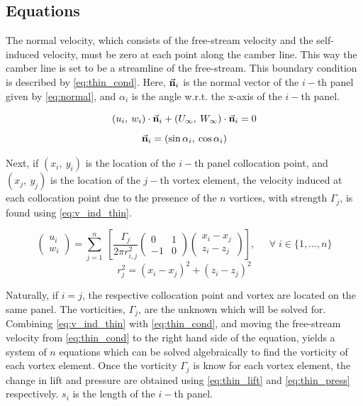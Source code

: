 \subsection{Equations}
The normal velocity, which consists of the free-stream velocity and the
self-induced velocity, must be zero at each point along the camber line. This
way the camber line is set to be a streamline of the free-stream. This
boundary condition is described by \autoref{eq:thin_cond}. Here,
$\vec{\bf{n}}_i$ is the normal vector of the $i-$th panel given by
\autoref{eq:normal}, and $\alpha_i$ is the angle w.r.t. the x-axis of the $i-$th
panel.

\begin{equation}
\label{eq:thin_cond}
    \left( u_i, \: w_i \right) \cdot \vec{\bf{n}}_i + \left( U_\infty,
    \: W_\infty \right) \cdot  \vec{\bf{n}}_i = 0
\end{equation}
\begin{equation}
\label{eq:normal}
    \vec{\bf{n}}_i = \left( \sin \alpha_i, \: \cos \alpha_i \right)
\end{equation}

Next, if $\left( x_i, \: y_i \right)$ is the location of the $i-$th panel
collocation point, and $\left( x_j, \: y_j \right)$ is the location of the
$j-$th vortex element, the velocity induced at each collocation point due to the
presence of the $n$ vortices, with strength $\Gamma_j$, is found using
\autoref{eq:v_ind_thin}.
\medskip

\begin{equation}
\label{eq:v_ind_thin}
    \left(\begin{array}{l}
    u_i \\ w_i
    \end{array}\right)
    =
    \sum_{j=1}^{n} \:
    \left[ \frac{\Gamma_{j}}{2 \pi r_{i,j}^{2}}
    \left(\begin{array}{cc}
    0 & 1 \\ -1 & 0
    \end{array}\right)
    \left(\begin{array}{l}
    x_i-x_{j} \\ z_i-z_{j}
    \end{array}\right) \right], \; \; \; \; \; \forall \; i \in \{1,...,n\}
\end{equation}
\begin{equation}r_{j}^{2}=\left(x_i-x_j\right)^{2}+\left(z_i-z_j\right)^{2}\end{equation}
\medskip

Naturally, if $i=j$, the respective collocation point and vortex are located
on the same panel. The vorticities, $\Gamma_j$, are the unknown which will be solved for.
Combining \autoref{eq:v_ind_thin} with \autoref{eq:thin_cond}, and moving the free-stream
velocity from \autoref{eq:thin_cond} to the right hand side of the equation,  yields a
system of $n$ equations which can be solved algebraically to find the vorticity of each vortex element.
Once the vorticity $\Gamma_j$ is know for each vortex element, the change in lift and
pressure are obtained using \autoref{eq:thin_lift} and \autoref{eq:thin_press} respectively.
 $s_i$ is the length of the $i-$th panel.


